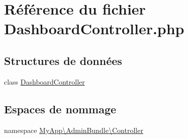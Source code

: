 \hypertarget{_dashboard_controller_8php}{\section{Référence du fichier Dashboard\-Controller.\-php}
\label{_dashboard_controller_8php}
}
\subsection*{Structures de données}
\begin{DoxyCompactItemize}
\item 
class \hyperlink{class_my_app_1_1_admin_bundle_1_1_controller_1_1_dashboard_controller}{Dashboard\-Controller}
\end{DoxyCompactItemize}
\subsection*{Espaces de nommage}
\begin{DoxyCompactItemize}
\item 
namespace \hyperlink{namespace_my_app_1_1_admin_bundle_1_1_controller}{My\-App\textbackslash{}\-Admin\-Bundle\textbackslash{}\-Controller}
\end{DoxyCompactItemize}
